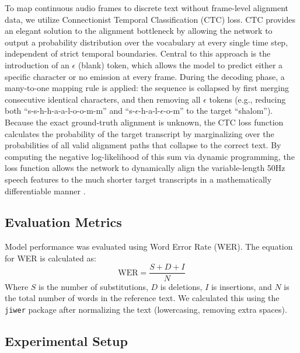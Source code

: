 \documentclass[conference]{IEEEtran}
\begin{document}
To map continuous audio frames to discrete text without frame-level alignment data, we utilize Connectionist Temporal Classification (CTC) loss.
CTC provides an elegant solution to the alignment bottleneck by allowing the network to output a probability distribution over the vocabulary at every single time step, independent of strict temporal boundaries.
Central to this approach is the introduction of an $\epsilon$ (blank) token, which allows the model to predict either a specific character or no emission at every frame.
During the decoding phase, a many-to-one mapping rule is applied: the sequence is collapsed by first merging consecutive identical characters, and then removing all $\epsilon$ tokens (e.g., reducing both ``s-s-h-h-a-a-l-o-o-m-m'' and ``s-$\epsilon$-h-a-l-$\epsilon$-o-m'' to the target ``shalom'').
Because the exact ground-truth alignment is unknown, the CTC loss function calculates the probability of the target transcript by marginalizing over the probabilities of all valid alignment paths that collapse to the correct text.
By computing the negative log-likelihood of this sum via dynamic programming, the loss function allows the network to dynamically align the variable-length 50Hz speech features to the much shorter target transcripts in a mathematically differentiable manner \cite{ctc_distill}.

\subsection{Evaluation Metrics}
Model performance was evaluated using Word Error Rate (WER).
The equation for WER is calculated as:
\begin{equation}
\text{WER} = \frac{S + D + I}{N}
\label{eq:wer}
\end{equation}
Where $S$ is the number of substitutions, $D$ is deletions, $I$ is insertions, and $N$ is the total number of words in the reference text.
We calculated this using the \texttt{jiwer} package after normalizing the text (lowercasing, removing extra spaces).

\subsection{Experimental Setup}
\end{document}
